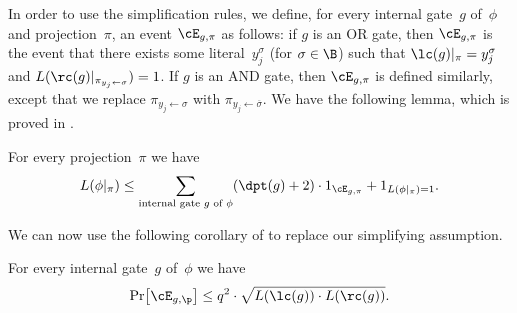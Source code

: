 \documentclass{toc}
\begin{document}
In order to use the simplification rules, we define, for every internal
gate~$g$ of~$\phi$ and projection~$\pi$, an event $\cE_{g,\pi}$
as follows: if $g$ is an OR gate, then $\cE_{g,\pi}$ is the event
that there exists some literal~$y_{j}^{\sigma}$ (for $\sigma\in\B$)
such that $\lc(g)|_{\pi}=y_{j}^{\sigma}$ and $L(\rc(g)|_{\pi_{y_{j}\gets\sigma}})=1$.
If $g$ is an AND gate, then $\cE_{g,\pi}$ is defined similarly,
except that we replace $\pi_{y_{j}\gets\sigma}$ with $\pi_{y_{j}\gets\overline{\sigma}}$.
We have the following lemma, which is proved in . 
\begin{lemma}
\label{lemma:reduction-to-size-2-with-substitution}For every projection~$\pi$
we have 
\[
L(\phi|_{\pi})\le\sum_{\text{internal gate \ensuremath{g} of \ensuremath{\phi}}}(\dpt(g)+2)\cdot1_{\cE_{g,\pi}}+1_{L(\phi|_{\pi})=1}.
\]
\end{lemma}

We can now use the following corollary of 
to replace our simplifying assumption. 
\begin{corollary}
\label{cor:shrinkage-to-two-literals}For every internal gate~$g$ of~$\phi$
we have 
\[
\Pr\!\left[\cE_{g,\p}\right]\le q^{2}\cdot\sqrt{L(\lc(g))\cdot L(\rc(g))}.
\]
\end{corollary}
\end{document}
